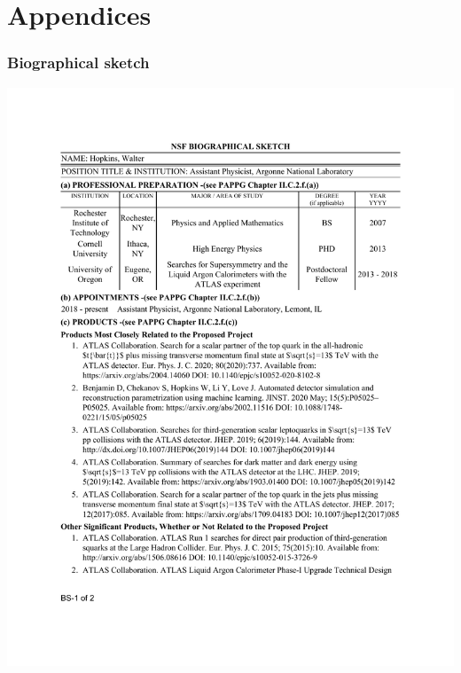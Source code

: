 \documentclass[letter, USenglish, 11pt, subfigure]{article}
\begin{document}
\appendix
\part*{Appendices}
\section{Biographical sketch}
\centerline{\includegraphics[width=0.99\paperwidth,trim=0 1.73in 0 1.06in,clip]{bioSketch.pdf}}


\clearpage

% 
% 
\end{document}
